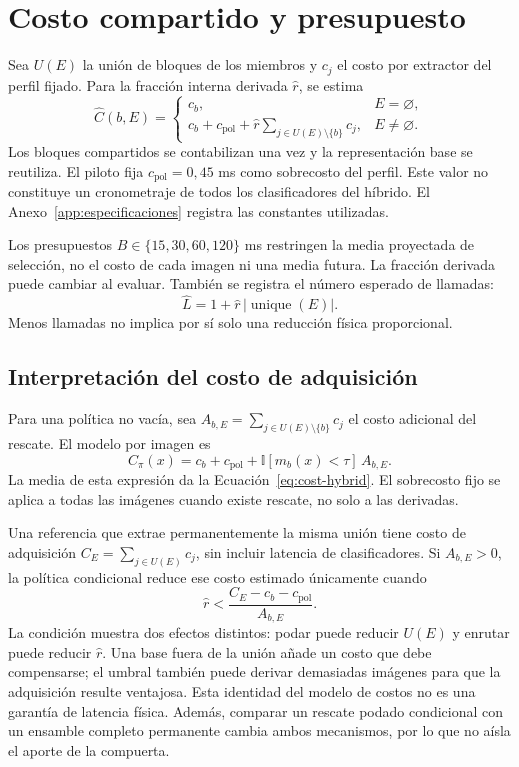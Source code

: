 \section{Costo compartido y presupuesto}
Sea $U(E)$ la unión de bloques de los miembros y $c_j$ el costo por extractor del perfil fijado. Para la fracción interna derivada $\widehat r$, se estima
\begin{equation}
\widehat C(b,E)=
\begin{cases}
c_b,&E=\varnothing,\\
c_b+c_{\mathrm{pol}}+\widehat r
\displaystyle\sum_{j\in U(E)\setminus\{b\}}c_j,&E\ne\varnothing.
\end{cases}
\label{eq:cost-hybrid}
\end{equation}
Los bloques compartidos se contabilizan una vez y la representación base se reutiliza. El piloto fija $c_{\mathrm{pol}}=0{,}45$ ms como sobrecosto del perfil. Este valor no constituye un cronometraje de todos los clasificadores del híbrido. El Anexo~\ref{app:especificaciones} registra las constantes utilizadas.

Los presupuestos $B\in\{15,30,60,120\}$ ms restringen la media proyectada de selección, no el costo de cada imagen ni una media futura. La fracción derivada puede cambiar al evaluar. También se registra el número esperado de llamadas:
\begin{equation}
\widehat L=1+\widehat r\,|\operatorname{unique}(E)|.
\end{equation}
Menos llamadas no implica por sí solo una reducción física proporcional.

\subsection{Interpretación del costo de adquisición}
Para una política no vacía, sea $A_{b,E}=\sum_{j\in U(E)\setminus\{b\}}c_j$ el costo adicional del rescate. El modelo por imagen es
\begin{equation}
C_\pi(x)=c_b+c_{\mathrm{pol}}+
\mathbb I[m_b(x)<\tau]\,A_{b,E}.
\end{equation}
La media de esta expresión da la Ecuación~\ref{eq:cost-hybrid}. El sobrecosto fijo se aplica a todas las imágenes cuando existe rescate, no solo a las derivadas.

Una referencia que extrae permanentemente la misma unión tiene costo de adquisición $C_E=\sum_{j\in U(E)}c_j$, sin incluir latencia de clasificadores. Si $A_{b,E}>0$, la política condicional reduce ese costo estimado únicamente cuando
\begin{equation}
\widehat r < \frac{C_E-c_b-c_{\mathrm{pol}}}{A_{b,E}}.
\label{eq:break-even}
\end{equation}
La condición muestra dos efectos distintos: podar puede reducir $U(E)$ y enrutar puede reducir $\widehat r$. Una base fuera de la unión añade un costo que debe compensarse; el umbral también puede derivar demasiadas imágenes para que la adquisición resulte ventajosa. Esta identidad del modelo de costos no es una garantía de latencia física. Además, comparar un rescate podado condicional con un ensamble completo permanente cambia ambos mecanismos, por lo que no aísla el aporte de la compuerta.

